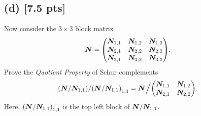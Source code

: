\documentclass[twoside,10pt]{article}
\begin{document}
\subsection*{(d) [7.5 pts]}
Now consider the $3 \times 3$ block matrix 
\begin{equation}
  \mtx{N} = 
  \begin{pmatrix}
    \mtx{N}_{1, 1} & \mtx{N}_{1, 2} & \mtx{N}_{1, 3} \\
    \mtx{N}_{2, 1} & \mtx{N}_{2, 2} & \mtx{N}_{2, 3} \\
    \mtx{N}_{3, 1} & \mtx{N}_{3, 2} & \mtx{N}_{3, 3}
  \end{pmatrix}.
\end{equation}
Prove the \emph{Quotient Property} of Schur complements
\begin{equation}
  \left(\mtx{N} / \mtx{N}_{1, 1}\right) / \left(\mtx{N} / \mtx{N}_{1, 1}\right)_{1, 1} 
  = 
  \mtx{N} \Big / 
  \begin{pmatrix}
    \mtx{N}_{1, 1} & \mtx{N}_{1, 2} \\
    \mtx{N}_{2, 1} & \mtx{N}_{2, 2} 
  \end{pmatrix}.
\end{equation}
Here, $\left(\mtx{N} / \mtx{N}_{1, 1}\right)_{1, 1}$ is the top left block of $\bm{N} / \bm{N}_{1, 1}$. 
\end{document}
